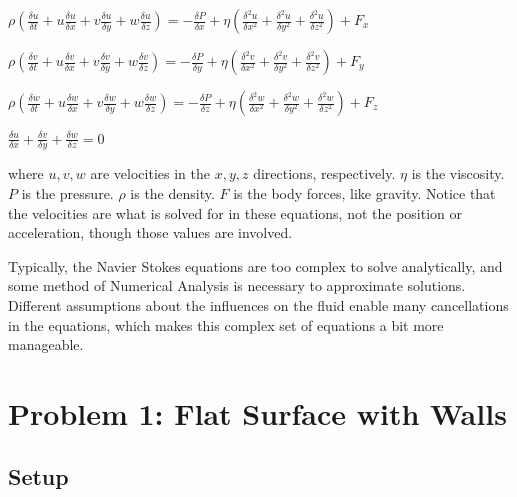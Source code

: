 \documentclass{article}
\begin{document}
	\begin{center}
	$\rho(\frac{\delta u}{\delta t}+u\frac{\delta u}{\delta x}+v\frac{\delta u}{\delta y}+w\frac{\delta u}{\delta z})=-\frac{\delta P}{\delta x}+\eta(\frac{\delta^{2} u}{\delta x^2}+\frac{\delta^{2} u}{\delta y^2}+\frac{\delta^{2} u}{\delta z^2})+F_x$
	
	$\rho(\frac{\delta v}{\delta t}+u\frac{\delta v}{\delta x}+v\frac{\delta v}{\delta y}+w\frac{\delta v}{\delta z})=-\frac{\delta P}{\delta y}+\eta(\frac{\delta^{2} v}{\delta x^2}+\frac{\delta^{2} v}{\delta y^2}+\frac{\delta^{2} v}{\delta z^2})+F_y$
	
	$\rho(\frac{\delta w}{\delta t}+u\frac{\delta w}{\delta x}+v\frac{\delta w}{\delta y}+w\frac{\delta w}{\delta z})=-\frac{\delta P}{\delta z}+\eta(\frac{\delta^{2} w}{\delta x^2}+\frac{\delta^{2} w}{\delta y^2}+\frac{\delta^{2} w}{\delta z^2})+F_z$
	
	$\frac{\delta u}{\delta x}+\frac{\delta v}{\delta y}+\frac{\delta w}{\delta z}=0$
		
	\end{center}
where $u,v,w$ are velocities in the $x, y, z$ directions, respectively. $\eta$ is the viscosity. $P$ is the pressure. $\rho$ is the density. $F$ is the body forces, like gravity.
Notice that the velocities are what is solved for in these equations, not the position or acceleration, though those values are involved. 

Typically, the Navier Stokes equations are too complex to solve analytically, and some method of Numerical Analysis is necessary to approximate solutions. Different assumptions about the influences on the fluid enable many cancellations in the equations, which makes this complex set of equations a bit more manageable.

\section{Problem 1: Flat Surface with Walls}
	
	\subsection{Setup}
	
\end{document}
